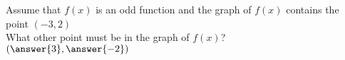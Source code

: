 \documentclass{ximera}
\author{David Kish}
\begin{document}
\begin{exercise}
Assume that $f(x)$ is an odd function and the graph of $f(x)$ contains the point $(-3,2)$\\
What other point must be in the graph of $f(x)$?\\
$(\answer{3},\answer{-2})$
\end{exercise}
\end{document}
